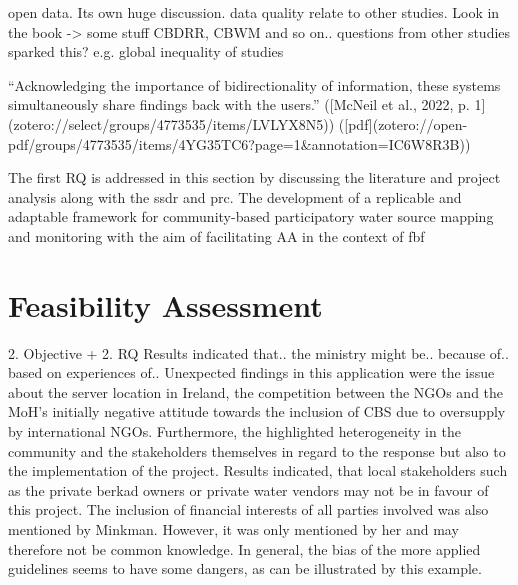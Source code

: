 open data. Its own huge discussion.
data quality
relate to other studies. Look in the book -> some stuff CBDRR, CBWM and so on..
questions from other studies sparked this? e.g. global inequality of studies



“Acknowledging the importance of bidirectionality of information, these systems simultaneously share findings back with the users.” ([McNeil et al., 2022, p. 1](zotero://select/groups/4773535/items/LVLYX8N5)) ([pdf](zotero://open-pdf/groups/4773535/items/4YG35TC6?page=1&annotation=IC6W8R3B))


The first RQ is addressed in this section by discussing the literature and project analysis along with the \acrshort{ssdr} and \acrshort{prc}. The development of a replicable and adaptable framework for community-based participatory water source mapping and monitoring with the aim of facilitating AA in the context of \acrlong{fbf} 


\section{Feasibility Assessment}
2. Objective + 2. RQ
Results indicated that.. the ministry might be.. because of.. based on experiences of.. 
Unexpected findings in this application were the issue about the server location in Ireland, the competition between the NGOs and the MoH's initially negative attitude towards the inclusion of CBS due to oversupply by international NGOs. Furthermore, the highlighted heterogeneity in the community and the stakeholders themselves in regard to the response but also to the implementation of the project. Results indicated, that local stakeholders such as the private berkad owners or private water vendors may not be in favour of this project. The inclusion of financial interests of all parties involved was also mentioned by Minkman. However, it was only mentioned by her and may therefore not be common knowledge. In general, the bias of the more applied guidelines seems to have some dangers, as can be illustrated by this example. %

